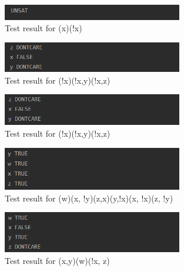 \documentclass{article}
\begin{document}
		\begin{figure}[H]
					\centering
			 			\includegraphics[width=0.7\textwidth]{dplltest2.png}
			 			\centering
			  			\caption{Test result for (x)(!x)}
			  			\label{fig:dplltest2}
					\end{figure}
	

		\begin{figure}[H]
					\centering
			 			\includegraphics[width=0.7\textwidth]{dplltest4.png}
			 			\centering
			  			\caption{Test result for (!x)(!x,y)(!x,z)}
			  			\label{fig:dplltest4}
					\end{figure}		

			\begin{figure}[H]
					\centering
			 			\includegraphics[width=0.7\textwidth]{dplltest5.png}
			 			\centering
			  			\caption{Test result for (!x)(!x,y)(!x,z)}
			  			\label{fig:dplltest5}
					\end{figure}	

				\begin{figure}[H]
					\centering
			 			\includegraphics[width=0.7\textwidth]{dplltest6.png}
			 			\centering
			  			\caption{Test result for (w)(x, !y)(z,x)(y,!x)(x, !x)(z, !y)}
			  			\label{fig:dplltest6}
					\end{figure}	

				\begin{figure}[H]
					\centering
			 			\includegraphics[width=0.7\textwidth]{dplltest7.png}
			 			\centering
			  			\caption{Test result for (x,y)(w)(!x, z)}
			  			\label{fig:dplltest7}
					\end{figure}	
										
\end{document}
